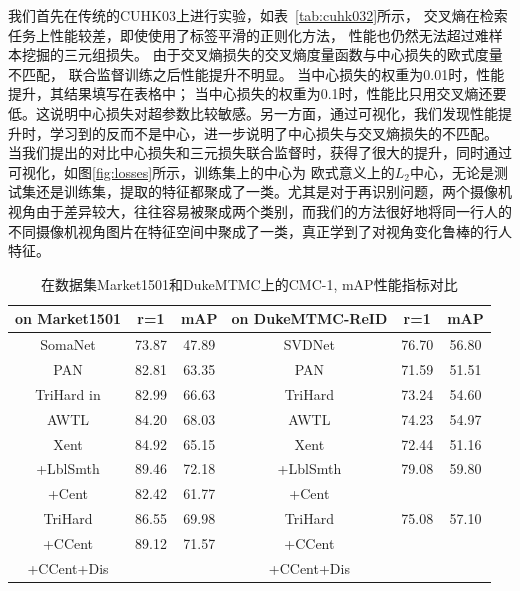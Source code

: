 我们首先在传统的CUHK03上进行实验，如表~\ref{tab:cuhk032}所示，
 交叉熵在检索任务上性能较差，即使使用了标签平滑的正则化方法，
性能也仍然无法超过难样本挖掘的三元组损失。
由于交叉熵损失的交叉熵度量函数与中心损失的欧式度量不匹配，
联合监督训练之后性能提升不明显。
当中心损失的权重为0.01时，性能提升，其结果填写在表格中；
当中心损失的权重为0.1时，性能比只用交叉熵还要低。这说明中心损失对超参数比较敏感。另一方面，通过可视化，我们发现性能提升时，学习到的反而不是中心，进一步说明了中心损失与交叉熵损失的不匹配。 
当我们提出的对比中心损失和三元损失联合监督时，获得了很大的提升，同时通过可视化，如图\ref{fig:losses}所示，训练集上的中心为
欧式意义上的$L_2$中心，无论是测试集还是训练集，提取的特征都聚成了一类。尤其是对于再识别问题，两个摄像机视角由于差异较大，往往容易被聚成两个类别，而我们的方法很好地将同一行人的不同摄像机视角图片在特征空间中聚成了一类，真正学到了对视角变化鲁棒的行人特征。

\begin{table}
	\centering
	\caption{在数据集Market1501和DukeMTMC上的CMC-1, mAP性能指标对比}
	\label{tab:market2}
	\begin{tabular}{c|cc||c|cc}
		\hline
		on Market1501                          & r=1   & mAP   & on DukeMTMC-ReID & r=1   & mAP   \\ \hline 
		SomaNet \cite{zheng2017ped}            & 73.87 & 47.89 & SVDNet           & 76.70 & 56.80 \\ 
		PAN \cite{barbosa2017looking}          & 82.81 & 63.35 & PAN              & 71.59 & 51.51 \\  
		TriHard in \cite{hermans2017defense}   & 82.99 & 66.63 & TriHard          & 73.24 & 54.60 \\ 
		AWTL        \cite{ristani2018features} & 84.20 & 68.03 & AWTL             & 74.23 & 54.97 \\ \hline  \hline 
		Xent                                   & 84.92 & 65.15 & Xent             & 72.44 & 51.16 \\ 
		+LblSmth                               & 89.46 & 72.18 & +LblSmth         &   79.08 & 59.80      \\ 
		+Cent                                  & 82.42 & 61.77 & +Cent            &       &       \\ 
		TriHard                                & 86.55 & 69.98 & TriHard          & 75.08 & 57.10 \\
		+CCent                                 & 89.12 & 71.57 & +CCent           &       &       \\
		+CCent+Dis                             &       &       & +CCent+Dis       &       &       \\  \hline 
	\end{tabular}
\end{table}


